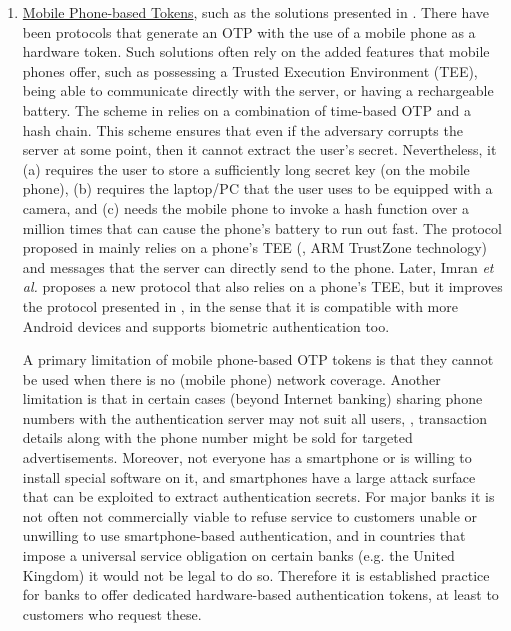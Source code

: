 \begin{enumerate}




%
\item \underline{Mobile Phone-based Tokens}, such as the solutions presented in \cite{SARA22,KoganMB17,KonothFFARB20}. There have been protocols that generate an OTP with the use of a mobile phone as a hardware token. Such solutions often rely on the added features that mobile phones offer, such as possessing a Trusted Execution Environment (TEE), being able to communicate directly with the server, or having a rechargeable battery. The scheme in \cite{KoganMB17} relies on a combination of time-based OTP and a hash chain. This scheme ensures that even if the adversary corrupts the server at some point, then it cannot extract the user's secret. Nevertheless, it  (a) requires the user to store a sufficiently long secret key (on the mobile phone), (b) requires the laptop/PC that the user uses to be equipped with a camera, and (c) needs the mobile phone to invoke a hash function over a million times that can cause the phone's battery to run out fast. The protocol proposed in \cite{KonothFFARB20} mainly relies on a phone's TEE (\ie,  ARM TrustZone technology) and messages that the server can directly send to the phone. Later,  Imran \textit{et al.} \cite{SARA22} proposes a new protocol that also relies on a phone's TEE, but it improves the protocol presented in \cite{KonothFFARB20}, in the sense that it is compatible with more Android devices and supports biometric authentication too. 

A primary limitation of mobile phone-based OTP tokens is that they cannot be used when there is no (mobile phone) network coverage. Another limitation is that in certain cases (beyond Internet banking) sharing phone numbers with the authentication server may not suit all users, \eg, transaction details along with the phone number might be sold for targeted advertisements. Moreover, not everyone has a smartphone or is willing to install special software on it, and smartphones have a large attack surface that can be exploited to extract authentication secrets.
For major banks it is not often not commercially viable to refuse service to customers unable or unwilling to use smartphone-based authentication, and in countries that impose a universal service obligation on certain banks (e.g. the United Kingdom) it would not be legal to do so.
Therefore it is established practice for banks to offer dedicated hardware-based authentication tokens, at least to customers who request these.

%
\end{enumerate}




